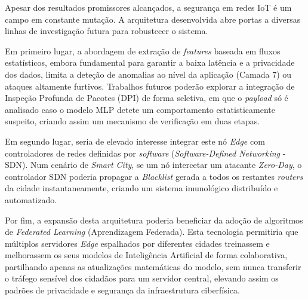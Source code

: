 Apesar dos resultados promissores alcançados, a segurança em redes IoT é um campo em constante mutação. A arquitetura desenvolvida abre portas a diversas linhas de investigação futura para robustecer o sistema.

Em primeiro lugar, a abordagem de extração de \textit{features} baseada em fluxos estatísticos, embora fundamental para garantir a baixa latência e a privacidade dos dados, limita a deteção de anomalias ao nível da aplicação (Camada 7) ou ataques altamente furtivos. Trabalhos futuros poderão explorar a integração de Inspeção Profunda de Pacotes (DPI) de forma seletiva, em que o \textit{payload} só é analisado caso o modelo MLP detete um comportamento estatisticamente suspeito, criando assim um mecanismo de verificação em duas etapas.

Em segundo lugar, seria de elevado interesse integrar este nó \textit{Edge} com controladores de redes definidas por \textit{software} (\textit{Software-Defined Networking} - SDN). Num cenário de \textit{Smart City}, se um nó intercetar um atacante \textit{Zero-Day}, o controlador SDN poderia propagar a \textit{Blacklist} gerada a todos os restantes \textit{routers} da cidade instantaneamente, criando um sistema imunológico distribuído e automatizado.

Por fim, a expansão desta arquitetura poderia beneficiar da adoção de algoritmos de \textit{Federated Learning} (Aprendizagem Federada). Esta tecnologia permitiria que múltiplos servidores \textit{Edge} espalhados por diferentes cidades treinassem e melhorassem os seus modelos de Inteligência Artificial de forma colaborativa, partilhando apenas as atualizações matemáticas do modelo, sem nunca transferir o tráfego sensível dos cidadãos para um servidor central, elevando assim os padrões de privacidade e segurança da infraestrutura ciberfísica.